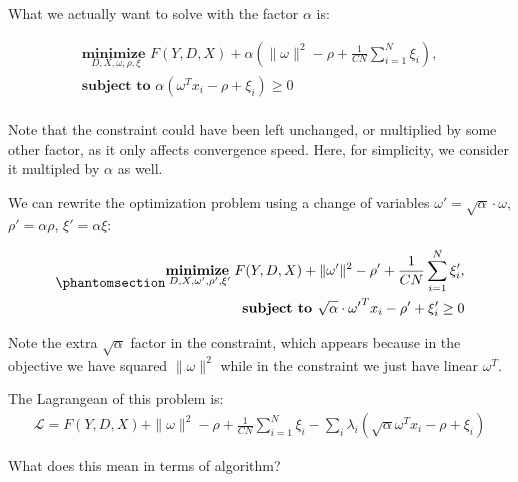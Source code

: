 \documentclass[
  letterpaper,
  DIV=11,
  numbers=noendperiod]{scrartcl}
\begin{document}
What we actually want to solve with the factor \(\alpha\) is:

\[
\begin{align}
\underset{D, X, \omega, \rho, \xi}{\textbf{minimize  }} F(Y, D, X) + \alpha \left(\|\omega\|^2 - \rho + \frac{1}{CN} \sum_{i=1}^{N} \xi_i \right), \\
\textbf{subject to  } \alpha \left(\omega^T x_i - \rho + \xi_i \right) \geq 0\\
\end{align}
\]

Note that the constraint could have been left unchanged, or multiplied
by some other factor, as it only affects convergence speed. Here, for
simplicity, we consider it multipled by \(\alpha\) as well.

We can rewrite the optimization problem using a change of variables
\(\omega' = \sqrt{\alpha} \cdot \omega\), \(\rho' = \alpha \rho\),
\(\xi' = \alpha \xi\):

\begin{equation}\phantomsection\label{eq-OCSVMconstr-correct}{
\begin{align}
\underset{D, X, \omega', \rho', \xi'}{\textbf{minimize  }} F(Y, D, X) + \|\omega'\|^2 - \rho' + \frac{1}{CN} \sum_{i=1}^{N} \xi_i' , \\
\textbf{subject to  } \sqrt{\alpha} \cdot {\omega'}^T x_i - \rho' + \xi_i' \geq 0
\end{align}
}\end{equation}

Note the extra \(\sqrt{\alpha}\) factor in the constraint, which appears
because in the objective we have squared \(\|\omega\|^2\) while in the
constraint we just have linear \(\omega^T\).

The Lagrangean of this problem is: \[
\begin{align}
\mathcal{L} = F(Y, D, X) + \|\omega\|^2 - \rho + \frac{1}{CN} \sum_{i=1}^{N} \xi_i - \sum_i \lambda_i \left( \sqrt{\alpha} \omega^T x_i - \rho + \xi_i \right)
\end{align}
\]

What does this mean in terms of algorithm?
\end{document}
